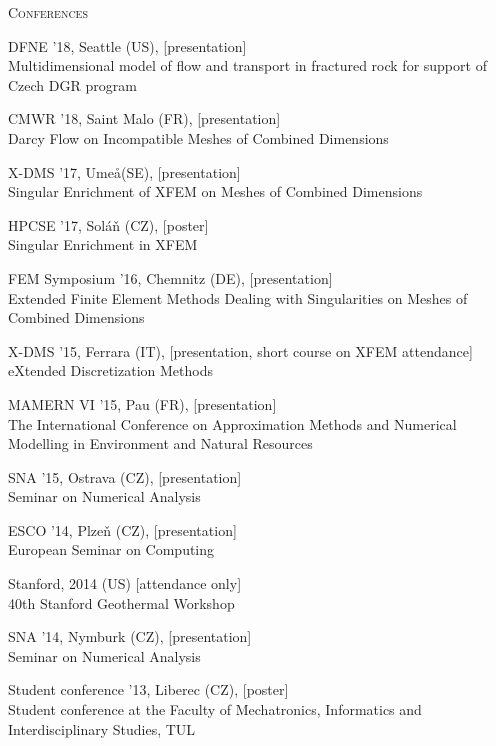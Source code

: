 \documentclass[bibliography=totocnumbered,dvipsnames,FM,Dis, EN]{tulthesis_autoreferat}
\begin{document}
\vspace{0.5cm}
%
{\noindent\large\textsc{Conferences}}
%
\begin{itemize}[label={}, leftmargin=*]
{\small
\item DFNE '18, Seattle (US), [presentation] \\ Multidimensional model of flow and transport in fractured
rock for support of Czech DGR program
\item CMWR '18, Saint Malo (FR), [presentation] \\ Darcy Flow on Incompatible Meshes of
Combined Dimensions
\item X-DMS '17, Ume\aa (SE), [presentation] \\ Singular Enrichment of XFEM on Meshes of
Combined Dimensions
\item HPCSE '17, Sol\'a{\v n} (CZ), [poster] \\ Singular Enrichment in XFEM
\item FEM Symposium '16, Chemnitz (DE), [presentation] \\ Extended Finite Element Methods Dealing with Singularities on Meshes of Combined Dimensions
\item X-DMS '15, Ferrara (IT), [presentation, short course on XFEM attendance]\\ eXtended Discretization Methods
\item MAMERN VI '15, Pau (FR), [presentation] \\ The International Conference on Approximation Methods and Numerical Modelling in Environment and Natural Resources
\item SNA '15, Ostrava (CZ), [presentation] \\ Seminar on Numerical Analysis
\item ESCO '14, Plze{\v n} (CZ), [presentation] \\ European Seminar on Computing
\item Stanford, 2014 (US) [attendance only] \\ 40th Stanford Geothermal Workshop
\item SNA '14, Nymburk (CZ), [presentation] \\ Seminar on Numerical Analysis
\item Student conference '13, Liberec (CZ), [poster] \\ Student conference at the Faculty of Mechatronics, Informatics and Interdisciplinary Studies, TUL
}
\end{itemize}




\newpage
{\small

% 

}
\end{document}
